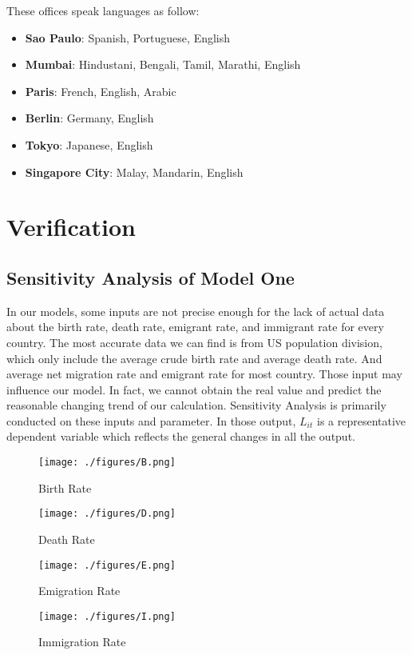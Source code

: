\documentclass{mcmthesis}
\begin{document}
These offices speak languages as follow:
\begin{itemize}
    \item \textbf{Sao Paulo}: Spanish, Portuguese, English
    \item \textbf{Mumbai}: Hindustani, Bengali, Tamil, Marathi, English
    \item \textbf{Paris}: French, English, Arabic
    \item \textbf{Berlin}: Germany, English
    \item \textbf{Tokyo}: Japanese, English
    \item \textbf{Singapore City}: Malay, Mandarin, English
\end{itemize}

\section{Verification}
\subsection{Sensitivity Analysis of Model One}
In our models, some inputs are not precise enough for the lack of actual data about the birth rate, death rate, emigrant rate, and immigrant rate for every country. The most accurate data we can find is from US population division, which only include the average crude birth rate and average death rate. And average net migration rate and emigrant rate for most country. Those input may influence our model. In fact, we cannot obtain the real value and predict the reasonable changing trend of our calculation. Sensitivity Analysis is primarily conducted on these inputs and parameter. In those output, $L_{it}$ is a representative dependent variable which reflects the general changes in all the output.


\begin{figure}[H]
    \texttt{[image: ./figures/B.png]}
    \caption{Birth Rate}
\end{figure}
\begin{figure}[H]
    \texttt{[image: ./figures/D.png]}
    \caption{Death Rate}
\end{figure}
\begin{figure}[H]
    \texttt{[image: ./figures/E.png]}
    \caption{Emigration Rate}
\end{figure}
\begin{figure}[H]
    \texttt{[image: ./figures/I.png]}
    \caption{Immigration Rate}
\end{figure}
\end{document}
